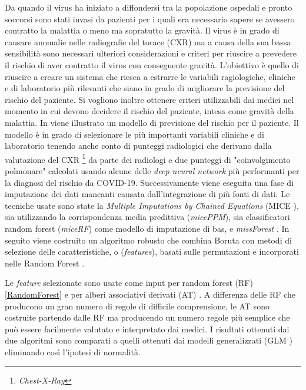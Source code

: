 \documentclass[12pt,italian]{report}
\begin{document}
	Da quando il virus ha iniziato a diffondersi tra la popolazione ospedali e pronto soccorsi sono stati invasi da pazienti per i quali era necessario sapere se avessero contratto la malattia o meno ma sopratutto la gravità. Il virus è in grado di causare anomalie nelle radiografie del torace (CXR) ma a causa della sua bassa sensibilità sono necessari ulteriori considerazioni e criteri per riuscire a prevedere il rischio di aver contratto il virus con conseguente gravità.
	L'obiettivo è quello di riuscire a creare un sistema che riesca a estrarre le variabili ragiologiche, cliniche e di laboratorio più rilevanti che siano in grado di migliorare la previsione del rischio del paziente. Si vogliono inoltre ottenere criteri utilizzabili dai medici nel momento in cui devono decidere il rischio del paziente, intesa come gravità della malattia. In \cite{Casiraghi2020-zt} viene illustrato un modello di previsione del rischio per il paziente. Il modello è in grado di selezionare le più importanti variabili cliniche e di laboratorio tenendo anche conto di punteggi radiologici che derivano dalla valutazione del CXR \footnote{\textit{Chest-X-Ray}} da parte dei radiologi e due punteggi di "coinvolgimento polmonare" calcolati usando alcune delle \textit{deep neural network} più performanti per la diagnosi del rischio da COVID-19.
	Successivamente viene eseguita una fase di imputazione dei dati mancanti causata dall'integrazione di più fonti di dati. Le tecniche usate sono state la \textit{Multiple Imputations by Chained Equations} (MICE \cite{JSSv045i03}), sia utilizzando la corrispondenza media predittiva (\textit{micePPM}), sia classificatori random forest (\textit{miceRF})  come modello di imputazione di bas, e \textit{missForest} \cite{10.1093/bioinformatics/btr597}.
	In seguito viene costruito un algoritmo robusto che combina Boruta \cite{JSSv036i11} \cite{Kursa2010} con metodi di selezione delle caratteristiche, o (\textit{features}), basati sulle permutazioni e incorporati nelle Random Forest \cite{Altmann2010-sw} \cite{Strobl2007}.
	
	Le \textit{feature} selezionate sono usate come input per random forest (RF) \ref{RandomForest} e per alberi associativi derivati (AT) \cite{e1bb70540db14ceeacddd4383fca9bff}. A differenza delle RF che producono un gran numero di regole di difficile comprensione, le AT sono costruite partendo dalle RF ma producendo un numero regole più semplice che può essere facilmente valutato e interpretato dai medici.
	I risultati ottenuti dai due algoritmi sono comparati a quelli ottenuti dai modelli generalizzati (GLM \cite{10.2307/2344614}) eliminando così l'ipotesi di normalità. 
	
\end{document}
